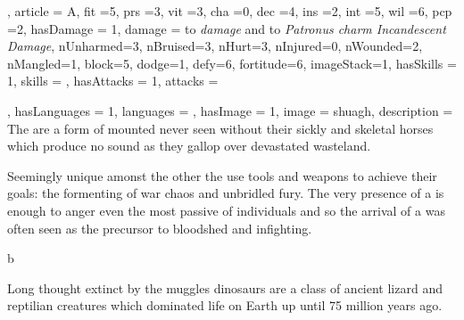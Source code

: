 {{

, article = A, fit =5, prs =3, vit =3, cha =0, dec =4, ins =2, int =5, wil =6, pcp =2, hasDamage = 1, damage = to \textit{ damage} and  to \textit{Patronus charm\comma{} Incandescent Damage}, nUnharmed=3, nBruised=3, nHurt=3, nInjured=0, nWounded=2, nMangled=1, block=5, dodge=1, defy=6, fortitude=6, imageStack=1, hasSkills = 1, skills = 
, hasAttacks = 1, attacks = 

, hasLanguages = 1, languages = , hasImage = 1, image = shuagh, description = The \name{} are a form of mounted \comma{} never seen without their sickly and skeletal horses\comma{} which produce no sound as they gallop over devastated wasteland. 

Seemingly unique amonst the other \comma{} the \name{} use tools and weapons to achieve their goals: the formenting of war\comma{} chaos and unbridled fury. The very presence of a \name{} is enough to anger even the most passive of individuals\comma{} and so the arrival of a \name{} was often seen as the precursor to bloodshed and infighting.}



}




{
	b
}
{







}








{
	Long thought extinct by the muggles\comma{} dinosaurs are a class of ancient lizard and reptilian creatures which dominated life on Earth up until 75 million years ago.
}
{




























}




